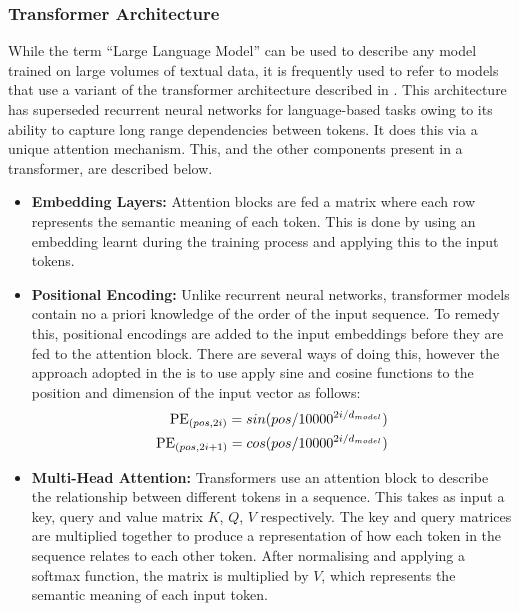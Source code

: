 \documentclass[12pt,twoside]{report}
\begin{document}
\subsubsection{Transformer Architecture}
While the term ``Large Language Model'' can be used to describe any model trained on large volumes of textual data, it is frequently used to refer to models that use a variant of the transformer architecture described in \cite{vaswani2017attention}.
This architecture has superseded recurrent neural networks for language-based tasks owing to its ability to capture long range dependencies between tokens.
It does this via a unique attention mechanism.
This, and the other components present in a transformer, are described below.
\begin{itemize}
  \item \textbf{Embedding Layers:} 
    Attention blocks are fed a matrix where each row represents the semantic meaning of each token. This is done by using an embedding learnt during the training process and applying this to the input tokens.
  \item \textbf{Positional Encoding:} 
    Unlike recurrent neural networks, transformer models contain no a priori knowledge of the order of the input sequence.
    To remedy this, positional encodings are added to the input embeddings before they are fed to the attention block.
    There are several ways of doing this, however the approach adopted in the \cite{vaswani2017attention} is to use apply sine and cosine functions to the position and dimension of the input vector as follows:
    \begin{equation*}
      \begin{split}
        \textnormal{PE}_{(pos, 2i)} = sin(pos/10000^{2i/d_{model}}) \\ 
        \textnormal{PE}_{(pos, 2i+1)} = cos(pos/10000^{2i/d_{model}})
      \end{split}
    \end{equation*}
  \item \textbf{Multi-Head Attention:}
    Transformers use an attention block to describe the relationship between different tokens in a sequence. 
    This takes as input a key, query and value matrix $K$, $Q$, $V$ respectively. 
    The key and query matrices are multiplied together to produce a representation of how each token in the sequence relates to each other token.
    After normalising and applying a softmax function, the matrix is multiplied by $V$, which represents the semantic meaning of each input token.
    \begin{equation*}

\end{equation*}
\end{itemize}
\end{document}
